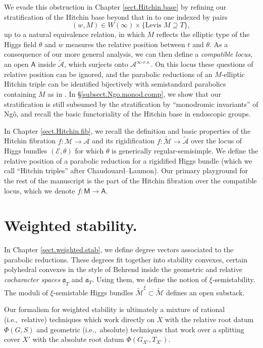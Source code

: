 \documentclass[openany]{amsbook}
\theoremstyle{definition}
\theoremstyle{remark}
\numberwithin{equation}{section}
\newcommand{\cA}{\mathcal{A}}
\newcommand{\cM}{\mathcal{M}}
\newcommand{\cE}{\mathcal{E}}
\newcommand{\ul}[1]{\underline{#1}}
\renewcommand{\-}{\operatorname{-}}
\renewcommand{\a}{\mathfrak{a}}
\newcommand{\ctM}{\widetilde{\cM}}
\newcommand{\ctA}{\widetilde{\cA}}
\newcommand{\bM}{\mathsf{M}}
\newcommand{\bA}{\mathsf{A}}
\begin{document}
We evade this obstruction in Chapter \ref{sect.Hitchin.base} by refining our stratification of the Hitchin base beyond that in \cite{CLI} to one indexed by pairs $$(w, M) \in W(\infty) \times \{\text{Levis $M \supseteq T$}\},$$ up to a natural equivalence relation, in which $M$ reflects the elliptic type of the Higgs field $\theta$ and $w$ measures the relative position between $t$ and $\theta$. As a consequence of our more general analysis, we can then define a \textit{compatible locus}, an open $\bA$ inside $\ctA$, which surjects onto $\cA^{\infty\text{-}r.s.}$. On this locus these questions of relative position can be ignored, and the parabolic reductions of an $M$-elliptic Hitchin triple can be identified bijectively with semistandard parabolics containing $M$ as in \cite{CLI}. In \S \ref{subsect.Ngo.monod.comp}, we show that our stratification is still subsumed by the stratification by ``monodromic invariants'' of Ng\^{o}, and recall the basic functoriality of the Hitchin base in endoscopic groups.

In Chapter \ref{sect.Hitchin.fib}, we recall the definition and basic properties of the Hitchin fibration $f : \cM \to \cA$ and its rigidification $f : \ctM \to \ctA$ over the locus of Higgs bundles $(\cE, \theta)$ for which $\theta$ is generically regular-semisimple. We define the relative position of a parabolic reduction for a rigidified Higgs bundle (which we call ``Hitchin triples'' after Chaudouard--Laumon). Our primary playground for the rest of the manuscript is the part of the Hitchin fibration over the compatible locus, which we denote $f : \bM \to \bA$. 




\section{Weighted stability.}

In Chapter \ref{sect.weighted.stab}, we define degree vectors associated to the parabolic reductions. These degrees fit together into stability convexes, certain polyhedral convexes in the style of Behrend \cite{behrendthesis} inside the geometric and relative \textit{cocharacter spaces} $\ul{\a}_T$ and $\a_T$. Using them, we define the notion of $\xi$-semistability. The moduli of $\xi$-semistable Higgs bundles $\ctM^{\xi} \subset \ctM$ defines an open substack.

Our formalism for weighted stability is ultimately a mixture of rational (i.e.,\ relative) techniques which work directly on $X$ with the relative root datum $\Phi(G, S)$ and geometric (i.e.,\ absolute) techniques that work over a splitting cover $X'$ with the absolute root datum $\Phi(G_{X'}, T_{X'})$.
\end{document}
